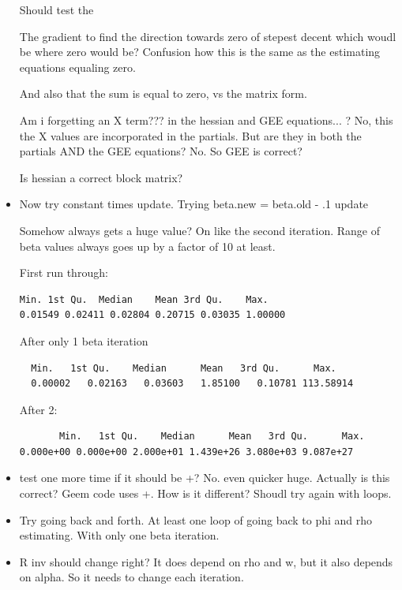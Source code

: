 \documentclass[10pt]{article}
\theoremstyle{definition}
\begin{document}
\begin{itemize}
Should test the

The gradient to find the direction towards zero of stepest decent which woudl be where zero would be? Confusion how this is the same as the estimating equations equaling zero.

And also that the sum is equal to zero, vs the matrix form.

Am i forgetting an X term??? in the hessian and GEE equations...
? No, this the X values are incorporated in the partials.
But are they in both the partials AND the GEE equations? No. So GEE is correct?

Is hessian a correct block matrix?




\item Now try constant times update. Trying beta.new = beta.old - .1 update

Somehow always gets a huge value? On like the second iteration. Range of beta values always goes up by a factor of 10 at least.

First run through:

\begin{verbatim}
Min. 1st Qu.  Median    Mean 3rd Qu.    Max.
0.01549 0.02411 0.02804 0.20715 0.03035 1.00000
\end{verbatim}

After only 1 beta iteration
\begin{verbatim}
  Min.   1st Qu.    Median      Mean   3rd Qu.      Max.
  0.00002   0.02163   0.03603   1.85100   0.10781 113.58914
\end{verbatim}

After 2:

\begin{verbatim}
       Min.   1st Qu.    Median      Mean   3rd Qu.      Max.
0.000e+00 0.000e+00 2.000e+01 1.439e+26 3.080e+03 9.087e+27
\end{verbatim}

\item test one more time if it should be +? No. even quicker huge. Actually is this correct? Geem code uses +. How is it different? Shoudl try again with loops.

\item Try going back and forth. At least one loop of going back to phi and rho estimating. With only one beta iteration.


\item R inv should change right? It does depend on rho and w, but it also depends on alpha. So it needs to change each iteration.


\end{itemize}
\end{document}
